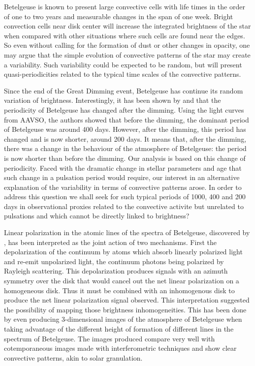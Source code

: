 \documentclass{aa}
\begin{document}
Betelgeuse is known to present large convective cells with life times in the order of one to two years and measurable changes 
in the span of one week. Bright convection cells near disk center will increase the integrated brightness of the star when 
compared with other situations where such cells are found near the edges. So even without calling for the formation of 
dust or other changes in opacity, one may argue that the simple evolution of convective patterns of the star may create a variability. Such 
variability could be expected to be random, but will present quasi-periodicities related to the typical time scales of the 
convective patterns. 

Since the end of the Great Dimming event, Betelgeuse has continue its random variation of brightness. 
Interestingly, 
it has been shown by \cite{jadlovsky_analysis_2023} and \cite{dupree_great_2022} that the periodicity of Betelgeuse has changed after the dimming. Using the light curves from AAVSO, 
the authors showed that before the dimming, the dominant period of Betelgeuse was around 400 days. However, after the dimming, this period has changed and 
is now shorter, around 200 days. It means that, after the dimming, there was a change in the behaviour of the atmosphere of Betelgeuse: the period is now
shorter than before the dimming. Our analysis is based on this change of periodicity. 
Faced with the dramatic change in stellar parameters and age that such change in a pulsation period would 
require, our interest in an alternative explanation of the variability
in terms  of convective patterns arose. In order to address this question we shall seek for such typical periods of 1000, 400 and 200 days in  
observational proxies related to the convective activite but unrelated to pulsations and which cannot be directly linked to brightness?

Linear polarization in the atomic lines of the spectra of Betelgeuse, discovered by \cite{auriere_discovery_2016}, has been interpreted as the joint action of 
two mechanisms. First the depolarization of the continuum by atoms which absorb linearly polarized light and re-emit unpolarized light, the 
continuum photons being polarized by Rayleigh scattering. This depolarization produces signals with an azimuth symmetry over the disk that 
would  cancel out the net linear polarization on a homogeneous disk. Thus it must be combined with an inhomogenous disk to produce the net linear polarization 
signal observed. This interpretation suggested the possibility of mapping those brightness inhomogeneities. This has been done by \cite{lopez_ariste_convective_2018} 
even producing 3-dimensional images of the atmosphere of Betelgeuse \citep{lopez_ariste_three-dimensional_2022} when taking advantage of the different height of formation of 
different lines in the spectrum of Betelgeuse. The images produced compare very well with cotemporaneous images made with interferometric 
techniques and show clear convective patterns, akin to solar granulation.
\end{document}
